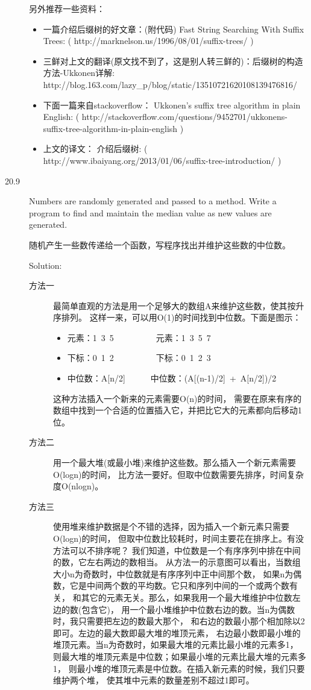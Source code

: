 \begin{description}
另外推荐一些资料：
\begin{itemize}
\itemsep=-3pt
\item 一篇介绍后缀树的好文章：(附代码) Fast String Searching With Suffix Trees: ( http://marknelson.us/1996/08/01/suffix-trees/ )
\item 三鲜对上文的翻译(原文找不到了，这是别人转三鲜的)：后缀树的构造方法-Ukkonen详解: http://blog.163.com/lazy\_p/blog/static/13510721620108139476816/
\item 下面一篇来自stackoverflow： Ukkonen’s suffix tree algorithm in plain English: ( http://stackoverflow.com/questions/9452701/ukkonens-suffix-tree-algorithm-in-plain-english )
\item 上文的译文： 介绍后缀树: ( http://www.ibaiyang.org/2013/01/06/suffix-tree-introduction/ )
\end{itemize}
%
%


\item[20.9] Numbers are randomly generated and passed to a method. Write a program to find and maintain the median value as new values are generated.

随机产生一些数传递给一个函数，写程序找出并维护这些数的中位数。

Solution:
\begin{description}
\item[方法一] 最简单直观的方法是用一个足够大的数组A来维护这些数，使其按升序排列。 这样一来，可以用O(1)的时间找到中位数。下面是图示：
\begin{itemize}
\itemsep=-3pt
\item 元素：1\ 3\ 5\ \ \ \ \ \ \ \ \ \ 元素：1\ 3\ 5\ 7
\item 下标：0\ 1\ 2\ \ \ \ \ \ \ \ \ \ 下标：0\ 1\ 2\ 3
\item 中位数：A[n/2]\ \ \ \ \ \ 中位数：(A[(n-1)/2]\ +\ A[n/2])/2
\end{itemize}
这种方法插入一个新来的元素需要O(n)的时间， 需要在原来有序的数组中找到一个合适的位置插入它，并把比它大的元素都向后移动1位。

\item[方法二] 用一个最大堆(或最小堆)来维护这些数。那么插入一个新元素需要O(logn)的时间， 比方法一要好。但取中位数需要先排序，时间复杂度O(nlogn)。

\item[方法三] 使用堆来维护数据是个不错的选择，因为插入一个新元素只需要O(logn)的时间， 但取中位数比较耗时，时间主要花在排序上。有没方法可以不排序呢？ 我们知道，中位数是一个有序序列中排在中间的数，它左右两边的数相当。 从方法一的示意图可以看出，当数组大小n为奇数时，中位数就是有序序列中正中间那个数， 如果n为偶数，它是中间两个数的平均数。它只和序列中间的一个或两个数有关， 和其它的元素无关。那么，如果我用一个最大堆维护中位数左边的数(包含它)， 用一个最小堆维护中位数右边的数。当n为偶数时，我只需要把左边的数最大那个， 和右边的数最小那个相加除以2即可。左边的最大数即最大堆的堆顶元素， 右边最小数即最小堆的堆顶元素。当n为奇数时，如果最大堆的元素比最小堆的元素多1， 则最大堆的堆顶元素是中位数；如果最小堆的元素比最大堆的元素多1， 则最小堆的堆顶元素是中位数。在插入新元素的时候，我们只要维护两个堆， 使其堆中元素的数量差别不超过1即可。


\end{description}
\end{description}
